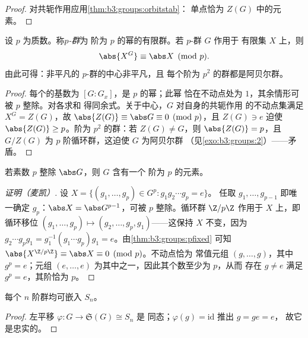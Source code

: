 \begin{proof}
对共轭作用应用\cref{thm:b3:groups:orbitstab}：
单点恰为 $Z(G)$ 中的元素。
\end{proof}

\begin{theorem}[$p$-群的不动点]\label{thm:b3:groups:pfixed}
设 $p$ 为质数。称\emph{$p$-群}为
阶为 $p$ 的幂的有限群。若 $p$-群 $G$ 作用于
有限集 $X$ 上，则
\[
\abs{X^G} \equiv \abs X \pmod p .
\]
由此可得：非平凡的 $p$-群的中心非平凡，且
每个阶为 $p^2$ 的群都是阿贝尔群。
\end{theorem}

\begin{proof}
每个的基数为 $[G:G_x]$，是 $p$ 的幂；此幂
恰在不动点处为 $1$，其余情形可被 $p$ 整除。对各求和
得同余式。关于中心，$G$ 对自身的共轭作用
的不动点集满足 $X^G = Z(G)$，故 $\abs{Z(G)} \equiv
\abs G \equiv 0 \pmod p$，且 $Z(G) \ni e$ 迫使 $\abs{Z(G)} \geq
p$。阶为 $p^2$ 的群：若 $Z(G) \neq G$，则 $\abs{Z(G)} = p$，且
$G/Z(G)$ 为 $p$ 阶循环群，这迫使 $G$ 为阿贝尔群
（见\cref{exo:b3:groups:2}）——矛盾。
\end{proof}

\begin{theorem}[柯西]\label{thm:b3:groups:cauchy}
若素数 $p$ 整除 $\abs G$，则 $G$ 含有一个
阶为 $p$ 的元素。
\end{theorem}

\begin{proof}[证明（麦凯）]
设 $X = \{(g_1, \dots, g_p) \in G^p : g_1 g_2 \cdots g_p = e\}$。
任取 $g_1, \dots, g_{p-1}$ 即唯一确定 $g_p$：$\abs X =
\abs G^{p-1}$，可被 $p$ 整除。循环群 $\Z/p\Z$ 作用于
$X$ 上，即循环移位 $(g_1, \dots, g_p) \mapsto (g_2, \dots, g_p,
g_1)$——这保持 $X$ 不变，因为 $g_2 \cdots g_p g_1 =
g_1^{-1}(g_1 \cdots g_p)g_1 = e$。由\cref{thm:b3:groups:pfixed}
可知 $\abs{X^{\Z/p\Z}} \equiv \abs X \equiv 0 \pmod p$。不动点恰为
常值元组 $(g, \dots, g)$，其中 $g^p = e$；元组 $(e,
\dots, e)$ 为其中之一，因此其个数至少为 $p$，从而
存在 $g \neq e$ 满足 $g^p = e$，其阶恰为 $p$。
\end{proof}

\begin{theorem}[凯莱]\label{thm:b3:groups:cayley}
每个 $n$ 阶群均可嵌入 $S_n$。
\end{theorem}

\begin{proof}
左平移 $\varphi \colon G \to \mathfrak S(G) \cong S_n$ 是
同态；$\varphi(g) = \mathrm{id}$ 推出 $g = ge = e$，
故它是忠实的。
\end{proof}

